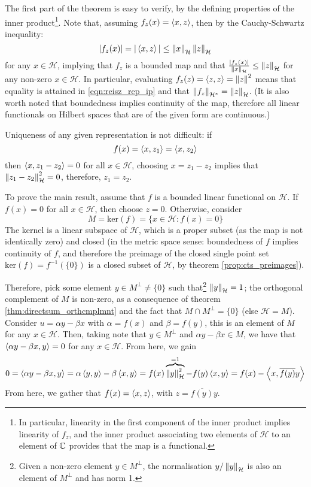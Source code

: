 \begin{bproof}{}{}
The first part of the theorem is easy to verify, by the defining properties of the inner product\footnote{In particular, linearity in the first component of the inner product implies linearity of $f_{z}$, and the inner product associating two elements of $\mathcal{H}$ to an element of $\mathbb{C}$ provides that the map is a functional.}. Note that, assuming $f_{z}(x) = \left\langle x, z \right\rangle$, then by the Cauchy-Schwartz inequality:
\begin{equation} \label{eqn:reisz_rep_ip}
{|f_{z}(x)|} = |\left\langle x, z \right\rangle| \leq {\left\lVert x \right\rVert_{\mathcal{H}} \left\lVert z \right\rVert_{\mathcal{H}}}  
\end{equation}
for any $x\in \mathcal{H}$, implying that $f_z$ is a bounded map and that \mbox{$\frac{|f_{z}(x)|}{\left\lVert x \right\rVert_{\mathcal{H}}} \leq \left\lVert z \right\rVert_{\mathcal{H}}$} for any non-zero $x\in\mathcal{H}$. In particular, evaluating \mbox{$f_{z}(z) = \left\langle z, z \right\rangle = \left\lVert z \right\rVert^{2}$} means that equality is attained in \eqref{eqn:reisz_rep_ip} and that \mbox{$\left\lVert f_{z} \right\rVert_{\mathcal{H}^{*}} = \left\lVert z \right\rVert_{\mathcal{H}}$.} (It is also worth noted that boundedness implies continuity of the map, therefore all linear functionals on Hilbert spaces that are of the given form are continuous.)

Uniqueness of any given representation is not difficult: if \[ f(x) = \left\langle x, z_{1} \right\rangle = \left\langle x, z_{2} \right\rangle \] then \mbox{$\left\langle x, z_1 - z_2 \right\rangle = 0$} for all $x\in\mathcal{H}$, choosing \mbox{$x = z_{1} - z_{2}$} implies that \mbox{$\left\lVert z_{1} - z_{2} \right\rVert_{\mathcal{H}}^{2}=0$}, therefore, \mbox{$z_{1}=z_{2}$.}

To prove the main result, assume that $f$ is a bounded linear functional on $\mathcal{H}$. If $f(x) = 0$ for all $x\in\mathcal{H}$, then choose $z=0$. Otherwise, consider \[ M = \text{ker}(f) = \{x\in\mathcal{H} : f(x) = 0 \}\]
The kernel is a linear subspace of $\mathcal{H}$, which is a proper subset (as the map is not identically zero) and closed (in the metric space sense: boundedness of $f$ implies continuity of $f$, and therefore the preimage of the closed single point set \mbox{$\text{ker}(f) = f^{-1}(\{0\})$} is a closed subset of $\mathcal{H}$, by theorem \ref{prop:cts_preimages}). 

Therefore, pick some element \mbox{$y\in M^{\perp} \neq \{0\}$} such that\footnote{Given a non-zero element $y\in M^{\perp}$, the normalisation $y/\left\lVert y \right\rVert_{\mathcal{H}}$ is also an element of $M^{\perp}$ and has norm 1.} $\left\lVert y \right\rVert_{\mathcal{H}} = 1$; the orthogonal complement of $M$ is non-zero, as a consequence of theorem \ref{thm:directsum_orthcmplmnt} and the fact that \mbox{$M\cap M^{\perp} = \{ 0\}$} (else $\mathcal{H} = M$). Consider \mbox{$u = \alpha y -  \beta x$} with $\alpha = f(x)$ and $\beta = f(y)$, this is an element of $M$ for any $x\in\mathcal{H}$. Then, taking note that $y\in M^{\perp}$ and $\alpha y -  \beta x \in M$, we have that \mbox{$\left\langle \alpha y -  \beta x, y \right\rangle = 0 $} for any $x\in\mathcal{H}$. From here, we gain
\[ 0 = \left\langle \alpha y -  \beta x, y \right\rangle = \alpha\left\langle y, y \right\rangle - \beta\left\langle x, y \right\rangle = f(x)\overbrace{\left\lVert y \right\rVert_{\mathcal{H}}^{2}}^{=1} - f(y) \left\langle x, y \right\rangle = f(x) - \left\langle x, \overline{f(y)}y \right\rangle \]
From here, we gather that \mbox{$f(x) = \left\langle x, z \right\rangle$}, with $z=\overline{f(y)}y$.
\eop
\end{bproof}
